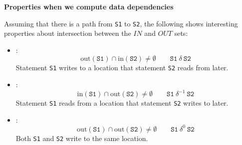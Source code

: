 \highspace
\begin{flushleft}
    \textcolor{Green3}{ \textbf{Properties when we compute data dependencies}}
\end{flushleft}
Assuming that there is a path from \texttt{S1} to \texttt{S2}, the following shows interesting properties about intersection between the $IN$ and $OUT$ sets:
\begin{itemize}
    \item {}:
    \begin{equation*}
        \mathrm{out}\left(\texttt{S1}\right) \cap \mathrm{in}\left(\texttt{S2}\right) \ne \emptyset \hspace{2em} \texttt{S1} \: \delta \: \texttt{S2}
    \end{equation*}
    Statement \texttt{S1} writes to a location that statement \texttt{S2} reads from later.

    \item {}:
    \begin{equation*}
        \mathrm{in}\left(\texttt{S1}\right) \cap \mathrm{out}\left(\texttt{S2}\right) \ne \emptyset \hspace{2em} \texttt{S1} \: \delta^{-1} \: \texttt{S2}
    \end{equation*}
    Statement \texttt{S1} reads from a location that statement \texttt{S2} writes to later.

    \item {}:
    \begin{equation*}
        \mathrm{out}\left(\texttt{S1}\right) \cap \mathrm{out}\left(\texttt{S2}\right) \ne \emptyset \hspace{2em} \texttt{S1} \: \delta^{0} \: \texttt{S2}
    \end{equation*}
    Both \texttt{S1} and \texttt{S2} write to the same location.
\end{itemize}

\newpage

